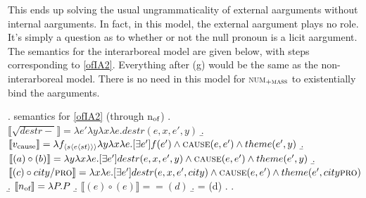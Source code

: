 \documentclass[12pt]{article}
\newcommand*{\textsub}[1]{\ensuremath{_\textrm{{\scriptsize #1}}}}
\begin{document}

\doublespacing

This ends up solving the usual ungrammaticality of external aarguments without internal aarguments. In fact, in this model, the external aargument plays no role. It's simply a question as to whether or not the null pronoun is a licit aargument. The semantics for the interarboreal model are given below, with steps corresponding to \ref{ofIA2}. Everything after (g) would be the same as the non-interarboreal model. There is no need in this model for \textsc{num}\textsub{\textsc{+mass}} to existentially bind the aarguments.

\singlespacing

\ex. semantics for \ref{ofIA2} (through n\textsub{of})
\a. \begin{math}\llbracket\sqrt{destr-}\rrbracket = \lambda e' \lambda y \lambda x \lambda e . destr(e,x,e',y)\end{math}
\b. \begin{math}\llbracket v\textsub{cause}\rrbracket = \lambda f_{\langle s\langle e \langle st \rangle \rangle \rangle} \lambda y \lambda x \lambda e . [\exists e']f(e') \land \textsc{cause}(e,e') \land theme(e',y)\end{math}
\b. \begin{math}\llbracket (a) \circ (b) \rrbracket = \lambda y \lambda x \lambda e . [\exists e'] destr(e,x,e',y) \land \textsc{cause}(e,e') \land theme(e',y) \end{math}
\b. \begin{math}\llbracket (c) \circ city/\textsc{pro}\rrbracket = \lambda x \lambda e . [\exists e'] destr(e,x,e',city) \land \textsc{cause}(e,e') \land theme(e',city\textsc{pro}) \end{math}
\b. \begin{math} \llbracket n\textsub{of} \rrbracket = \lambda P.P \end{math}
\b. \begin{math} \llbracket (e) \circ (e) \rrbracket == (d) \end{math}
\b. = (d)
\z. \z. \par
\end{document}
